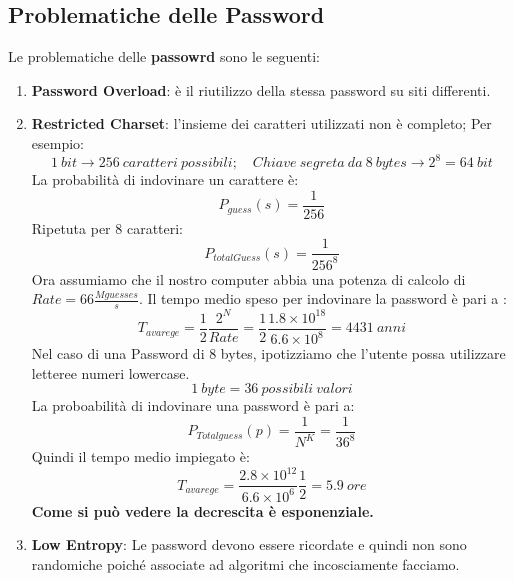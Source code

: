 \documentclass{article}
\theoremstyle{remark}
\begin{document}
\subsection{Problematiche delle Password}
Le problematiche delle \textbf{passowrd} sono le seguenti:
\begin{enumerate}
    \item \textbf{Password Overload}: è il riutilizzo della stessa password su siti differenti.
    \item \textbf{Restricted Charset}: l'insieme dei caratteri utilizzati non è completo;
    Per esempio:\begin{equation*}
        1\ bit\rightarrow 256\ caratteri\ possibili;\quad Chiave\ segreta\ da\ 8\ bytes\rightarrow 2^8=64\ bit
    \end{equation*}
    La probabilità di indovinare un carattere è:
    \begin{equation*}
        P_{guess}(s)=\frac{1}{256}
    \end{equation*}
    Ripetuta per 8 caratteri:\begin{equation*}
        P_{totalGuess}(s)=\frac{1}{256^8}
    \end{equation*} Ora assumiamo che il nostro computer abbia una potenza di calcolo di $Rate=66\frac{Mguesses}{s}$. Il tempo medio speso per indovinare la password è pari a :
    \begin{equation*}
        T_{avarege}=\frac{1}{2}\frac{2^N}{Rate}=\frac{1}{2}\frac{1.8\times10^{18}}{6.6\times10^{8}}=4431\ anni
    \end{equation*}
    Nel caso di una Password di 8 bytes, ipotizziamo che l'utente possa utilizzare letteree  numeri lowercase.\begin{equation*}
        1\ byte= 36\ possibili\ valori
    \end{equation*}
    La proboabilità di indovinare una password è pari a:
    \begin{equation*}
        P_{Totalguess}(p)=\frac{1}{N^K}=\frac{1}{36^8}
    \end{equation*}
    Quindi il tempo medio impiegato è:
    \begin{equation*}
        T_{avarege}=\frac{2.8\times10^12}{6.6\times10^6}\frac{1}{2}=5.9\ ore
    \end{equation*}
    \textbf{Come si può vedere la decrescita è esponenziale.}
    \item \textbf{Low Entropy}: Le password devono essere ricordate e quindi non sono randomiche poiché associate ad algoritmi che incosciamente facciamo. 

\end{enumerate}
\end{document}
